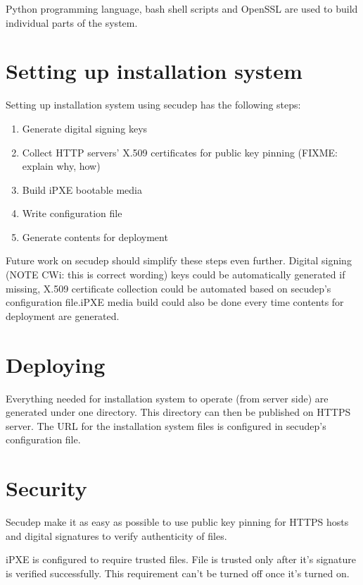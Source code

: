 Python programming language, bash shell scripts and OpenSSL are used
to build individual parts of the system.

\section{Setting up installation system}

Setting up installation system using secudep has the following steps:

\begin{enumerate}
  \item Generate digital signing keys
  \item Collect HTTP servers' X.509 certificates for public key pinning (FIXME: explain why, how)
  \item Build iPXE bootable media
  \item Write configuration file
  \item Generate contents for deployment
\end{enumerate}

Future work on secudep should simplify these steps even further.
Digital signing (NOTE CWi: this is correct wording) keys could be
automatically generated if missing, X.509 certificate collection could
be automated based on secudep's configuration file.\@ iPXE media build
could also be done every time contents for deployment are generated.

\section{Deploying}

Everything needed for installation system to operate (from server
side) are generated under one directory. This directory can then be
published on HTTPS server. The URL for the installation system files
is configured in secudep's configuration file.

\section{Security}

Secudep make it as easy as possible to use public key pinning for
HTTPS hosts and digital signatures to verify authenticity of files.

iPXE is configured to require trusted files. File is trusted only
after it's signature is verified successfully. This requirement can't
be turned off once it's turned on.
